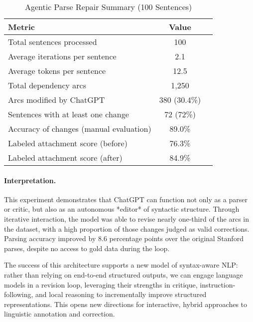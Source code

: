 \begin{table}[h]
\centering
\caption{Agentic Parse Repair Summary (100 Sentences)}
\label{tab:agentic-results}
\begin{tabular}{lcc}
\toprule
\textbf{Metric} & \textbf{Value} \\
\midrule
Total sentences processed & 100 \\
Average iterations per sentence & 2.1 \\
Average tokens per sentence & 12.5 \\
Total dependency arcs & 1,250 \\
Arcs modified by ChatGPT & 380 (30.4\%) \\
Sentences with at least one change & 72 (72\%) \\
Accuracy of changes (manual evaluation) & 89.0\% \\
\midrule
Labeled attachment score (before) & 76.3\% \\
Labeled attachment score (after) & 84.9\% \\
\bottomrule
\end{tabular}
\end{table}

\paragraph{Interpretation.}
This experiment demonstrates that ChatGPT can function not only as a parser or critic, but also as an autonomous *editor* of syntactic structure. Through iterative interaction, the model was able to revise nearly one-third of the arcs in the dataset, with a high proportion of those changes judged as valid corrections. Parsing accuracy improved by 8.6 percentage points over the original Stanford parses, despite no access to gold data during the loop.

The success of this architecture supports a new model of syntax-aware NLP: rather than relying on end-to-end structured outputs, we can engage language models in a revision loop, leveraging their strengths in critique, instruction-following, and local reasoning to incrementally improve structured representations. This opens new directions for interactive, hybrid approaches to linguistic annotation and correction.

